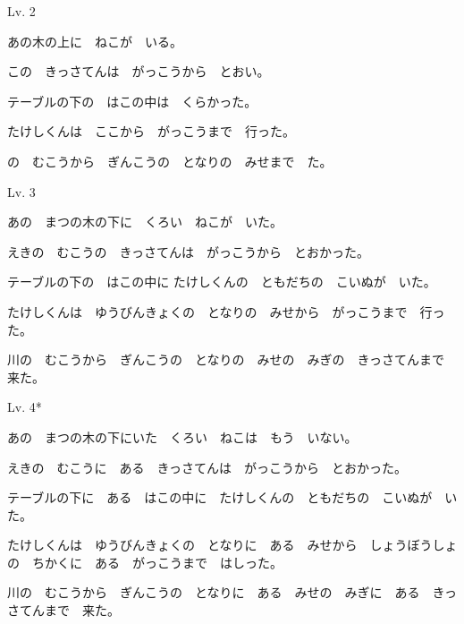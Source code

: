 	\begin{mondai}{Lv. 2}
		\item あの木の上に　ねこが　いる。
		\item この　きっさてんは　がっこうから　とおい。
		\item テーブルの下の　はこの中は　くらかった。
		\item たけしくんは　ここから　がっこうまで　行った。
		\item {}の　むこうから　ぎんこうの　となりの　みせまで　た。
	\end{mondai}

	\begin{mondai}{Lv. 3\footnotemark[1]}
		\item あの　まつの木の下に　くろい　ねこが　いた。
		\item えきの　むこうの　きっさてんは　がっこうから　とおかった。
		\item テーブルの下の　はこの中に たけしくんの　ともだちの　こいぬが　いた。
		\item たけしくんは　ゆうびんきょくの　となりの　みせから　がっこうまで　行った。
		\item 川の　むこうから　ぎんこうの　となりの　みせの　みぎの　きっさてんまで　来た。
	\end{mondai}
	
	\begin{mondai}{Lv. 4*}
		\item あの　まつの木の下にいた　くろい　ねこは　もう　いない。
		\item えきの　むこうに　ある　きっさてんは　がっこうから　とおかった。
		\item テーブルの下に　ある　はこの中に　たけしくんの　ともだちの　こいぬが　いた。
		\item たけしくんは　ゆうびんきょくの　となりに　ある　みせから　しょうぼうしょの　ちかくに　ある　がっこうまで　はしった。
		\item 川の　むこうから　ぎんこうの　となりに　ある　みせの　みぎに　ある　きっさてんまで　来た。
	\end{mondai}


